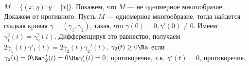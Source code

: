 \begin{example}
    \(M = \{(x, y) : y = |x|\}\). Покажем, что \(M\) --- не одномерное многообразие. Докажем от противного. Пусть \(M\) --- одномерное многообразие, тогда найдется гладкая кривая \(\gamma = (\gamma_1, \gamma_2)\), такая, что \(\gamma(0) = 0, \gamma'(0) \ne 0\). Имеем: \(\gamma_1^2(t) = \gamma_2^2(t)\). Дифференцируя  это равнество, получаем \(2\gamma_1(t)\gamma'_1(t) = 2\gamma_2(t)\gamma_2'(t)\). \(\gamma_2(t) \ge 0 \Ra \) если \(\gamma_2(t) = 0 \Ra \gamma_2'(t) = 0 \Ra \gamma_1'(t) = 0\), противоречие, т.к. \( \gamma'(t) = 0\), противоречие.
\end{example}
